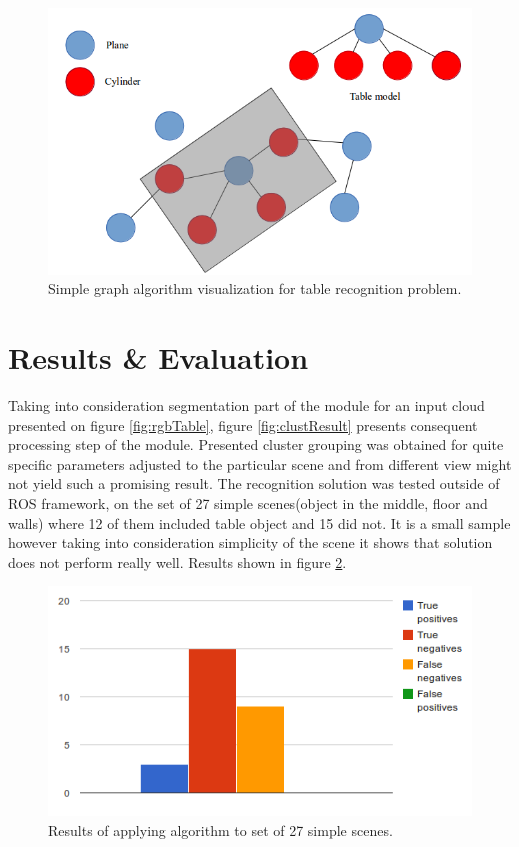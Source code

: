 \documentclass[12pt,oneside]{amsart}
\begin{document}
\begin{figure}
\begin{center}
  \includegraphics[scale=0.5]{images/graph}
  \caption{Simple graph algorithm visualization for table recognition problem.}
  \label{graphAlg}
  \end{center}
\end{figure}

\section{Results \& Evaluation}
Taking into consideration segmentation part of the module for an input cloud presented on figure \ref{fig:rgbTable}, figure \ref{fig:clustResult} presents consequent processing step of the module. Presented cluster grouping was obtained for quite specific parameters adjusted to the particular scene and from different view might not yield such a promising result.
The recognition solution was tested outside of ROS framework, on the set of 27 simple scenes(object in the middle, floor and walls) where 12 of them included table object and 15 did not. It is a small sample however taking into consideration simplicity of the scene it shows that solution does not perform really well. Results shown in figure \ref{fig:resultChart}.

\begin{figure}
\begin{center}
  \includegraphics[scale=0.7]{images/resultChart}
  \caption{Results of applying algorithm to set of 27 simple scenes.}
  \label{fig:resultChart}
  \end{center}
\end{figure}
\end{document}
